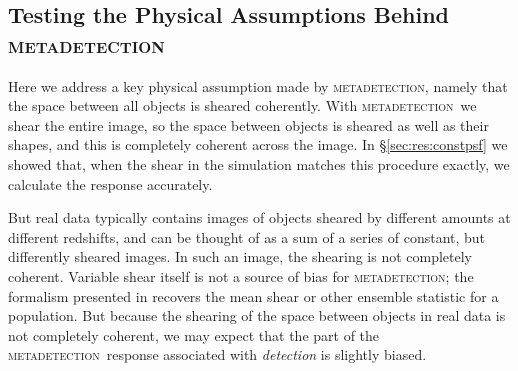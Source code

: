 \documentclass[draft, iop, twocolappendix, appendixfloats, numberedappendix, apj]{hackemulateapj}
\newcommand{\mdet}{\textsc{metadetection}}
\begin{document}
\subsection{Testing the Physical Assumptions Behind \mdet}
\label{sec:mdetphys}

Here we address a key physical assumption made by \mdet, namely that the space
between all objects is sheared coherently.   With \mdet\ we shear the entire
image, so the space between objects is sheared as well as their shapes, and this
is completely coherent across the image.  In \S \ref{sec:res:constpsf} we
showed that, when the shear in the simulation matches this procedure exactly,
we calculate the response accurately.

But real data typically contains images of objects sheared by different amounts
at different redshifts, and can be thought of as a sum of a series of constant,
but differently sheared images.  In such an image, the shearing is not
completely coherent.  Variable shear itself is not a source of bias for \mdet;
the formalism presented in \citep{SheldonMcal2017} recovers the mean shear or
other ensemble statistic for a population.  But because the shearing of the
space between objects in real data is not completely coherent, we may expect
that the part of the \mdet\ response associated with {\em detection} is
slightly biased.

\end{document}
